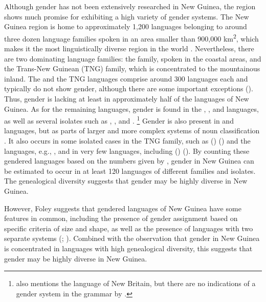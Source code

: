 \documentclass[output=collectionpaper]{langsci/langscibook}
\begin{document}
Although gender has not been extensively researched in New Guinea, the region shows much promise for exhibiting a high variety of gender systems. The New Guinea region is home to approximately 1,200 languages belonging to around three dozen language families spoken in an area smaller than 900,000 km\textsuperscript{2}, which makes it the most linguistically diverse region in the world \citep[357]{Foley2000}. Nevertheless, there are two dominating language families: the  family, spoken in the coastal areas, and the Trans-New Guinean (TNG) family, which is concentrated to the mountainous inland. The  and the TNG languages comprise around 300 languages each and typically do not show gender, although there are some important exceptions (\citealt[358--363]{Foley2000}). Thus, gender is lacking at least in approximately half of the languages of New Guinea. As for the remaining languages, gender is found in the , , and  languages, as well as several isolates such as , , and  \citep[371]{Foley2000}.%
\footnote{\citet[371]{Foley2000} also mentions the  language of New Britain, but there are no indications of a gender system in the grammar by \citet{Tharp1996}.} %
Gender is also present in  and  languages, but as parts of larger and more complex systems of noun classification \citep[371]{Foley2000}. It also occurs in some isolated cases in the TNG family, such as  () (\citealt{Svaerd2013}) and the  languages, e.g.,  \citep{Fedden2011}, and in very few  languages, including  () (\citealt{Mosel2000}). By counting these gendered languages based on the numbers given by \citet{Foley2000}, gender in New Guinea can be estimated to occur in at least 120 languages of different families and isolates. The genealogical diversity suggests that gender may be highly diverse in New Guinea.

However, Foley suggests that gendered languages of New Guinea have some features in common, including the presence of gender assignment based on specific criteria of size and shape, as well as the presence of languages with two separate systems (\citealt{Foley2000}; \citealt[8--9]{Svaerd2015}). Combined with the observation that gender in New Guinea is concentrated in languages with high genealogical diversity, this suggests that gender may be highly diverse in New Guinea.
\end{document}
